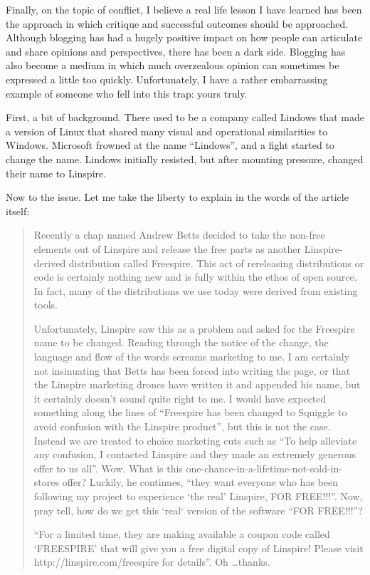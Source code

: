 Finally, on the topic of conflict, I believe a real life lesson I have learned has been the approach in which critique and successful outcomes should be approached. Although blogging has had a hugely positive impact on how people can articulate and share opinions and perspectives, there has been a dark side. Blogging has also become a medium in which much overzealous opinion can sometimes be expressed a little too quickly. Unfortunately, I have a rather embarrassing example of someone who fell into this trap: yours truly.

First, a bit of background. There used to be a company called Lindows that made a version of Linux that shared many visual and operational similarities to Windows. Microsoft frowned at the name ``Lindows'', and a fight started to change the name. Lindows initially resisted, but after mounting pressure, changed their name to Linspire.

Now to the issue. Let me take the liberty to explain in the words of the article itself:
\begin{quote}
 Recently a chap named Andrew Betts decided to take the non-free elements out of Linspire and release the free parts as another Linspire-derived distribution called Freespire. This act of rereleasing distributions or code is certainly nothing new and is fully within the ethos of open source. In fact, many of the distributions we use today were derived from existing tools.

Unfortunately, Linspire saw this as a problem and asked for the Freespire name to be changed. Reading through the notice of the change, the language and flow of the words screams marketing to me. I am certainly not insinuating that Betts has been forced into writing the page, or that the Linspire marketing drones have written it and appended his name, but it certainly doesn’t sound quite right to me. I would have expected something along the lines of ``Freespire has been changed to Squiggle to avoid confusion with the Linspire product'', but this is not the case. Instead we are treated to choice marketing cuts such as ``To help alleviate any confusion, I contacted Linspire and they made an extremely generous offer to us all''. Wow. What is this one-chance-in-a-lifetime-not-sold-in-stores offer? Luckily, he continues, ``they want everyone who has been following my project to experience ‘the real’ Linspire, FOR FREE!!!''. Now, pray tell, how do we get this ‘real‘ version of the software ``FOR FREE!!!''?

``For a limited time, they are making available a coupon code called ‘FREESPIRE’ that will give you a free digital copy of Linspire! Please visit http://linspire.com/freespire for details''. Oh \dots thanks.
\end{quote}

